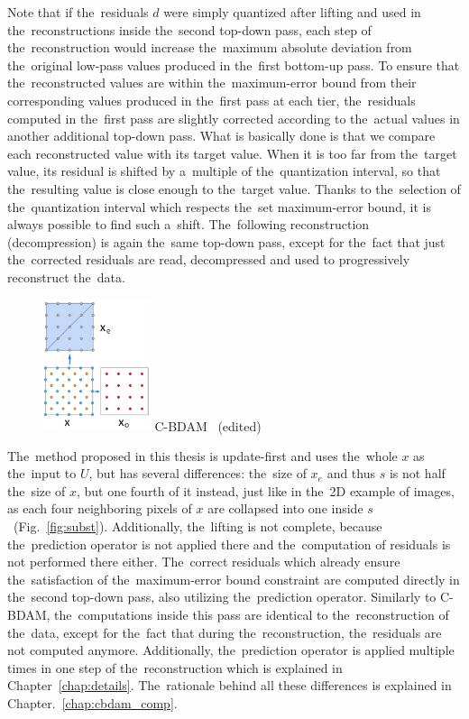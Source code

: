Note that if the~residuals $d$ were simply quantized after lifting and used in the~reconstructions inside the~second top-down pass, each step of the~reconstruction would increase the~maximum absolute deviation from the~original low-pass values produced in the~first bottom-up pass. To ensure that the~reconstructed values are within the~maximum-error bound from their corresponding values produced in the~first pass at each tier, the~residuals computed in the~first pass are slightly corrected according to the~actual values in another additional top-down pass. What is basically done is that we compare each reconstructed value with its target value. When it is too far from the~target value, its residual is shifted by a~multiple of the~quantization interval, so that the~resulting value is close enough to the~target value. Thanks to the~selection of the~quantization interval which respects the~set maximum-error bound, it is always possible to find such a~shift. The~following reconstruction (decompression) is again the~same top-down pass, except for the~fact that just the~corrected residuals are read, decompressed and used to progressively reconstruct the~data.

\begin{figure}
	\includegraphics[width=0.28\textwidth]{figures/cbdam_lifting.png}\centering
	{C-BDAM~\cite{cbdam} (edited)}
	\label{fig:cbdam_lifting}
\end{figure}

The~method proposed in this thesis is update-first and uses the~whole $x$ as the~input to $U$, but has several differences: the~size of $x_e$ and thus $s$ is not half the~size of $x$, but one fourth of it instead, just like in the~2D example of images, as each four neighboring pixels of $x$ are collapsed into one inside $s$~(Fig.~\ref{fig:subst}). Additionally, the~lifting is not complete, because the~prediction operator is not applied there and the~computation of residuals is not performed there either. The~correct residuals which already ensure the~satisfaction of the~maximum-error bound constraint are computed directly in the~second top-down pass, also utilizing the~prediction operator. Similarly to C-BDAM, the~computations inside this pass are identical to the~reconstruction of the~data, except for the~fact that during the~reconstruction, the~residuals are not computed anymore. Additionally, the~prediction operator is applied multiple times in one step of the~reconstruction which is explained in Chapter~\ref{chap:details}. The~rationale behind all these differences is explained in Chapter.~\ref{chap:cbdam_comp}.

